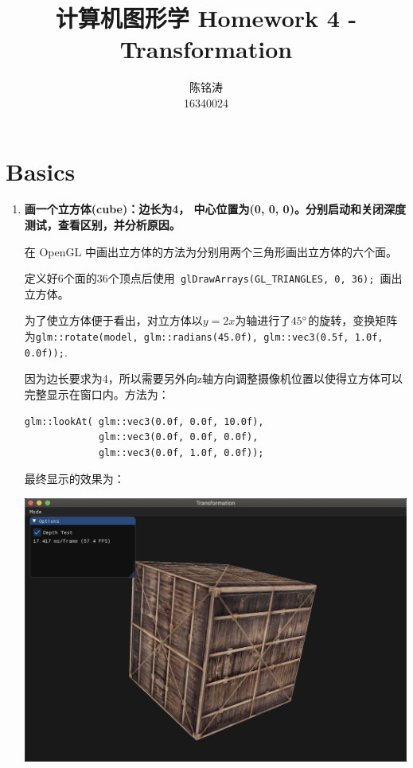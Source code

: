 \documentclass[12pt]{article}
\begin{document}
\author{陈铭涛\\ 16340024}
\title{计算机图形学 Homework 4 - Transformation}
\date{\vspace{-5ex}}
\maketitle

\medskip


\section{Basics}

\begin{enumerate}

    \item \textbf{画一个立方体(cube)：边长为4， 中心位置为(0, 0, 0)。分别启动和关闭深度测试，查看区别，并分析原因。}
    \begin{sloppypar}
        在 OpenGL 中画出立方体的方法为分别用两个三角形画出立方体的六个面。

        定义好6个面的36个顶点后使用\lstinline{ glDrawArrays(GL_TRIANGLES, 0, 36); }画出立方体。

        为了使立方体便于看出，对立方体以$y=2x$为轴进行了$45\degree$的旋转，变换矩阵为\lstinline{glm::rotate(model, glm::radians(45.0f), glm::vec3(0.5f, 1.0f, 0.0f));}.

        因为边长要求为4，所以需要另外向z轴方向调整摄像机位置以使得立方体可以完整显示在窗口内。方法为：
        \begin{lstlisting}
glm::lookAt( glm::vec3(0.0f, 0.0f, 10.0f),
             glm::vec3(0.0f, 0.0f, 0.0f),
             glm::vec3(0.0f, 1.0f, 0.0f));
        \end{lstlisting}

        最终显示的效果为：
        \begin{center}
            \includegraphics[scale=0.4]{static.png}
        \end{center}


\end{sloppypar}
\end{enumerate}
\end{document}
